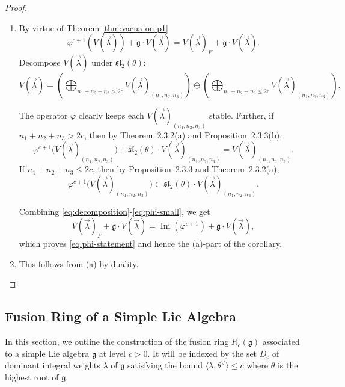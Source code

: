 \documentclass[12pt]{article}
\begin{document}
\begin{proof}
\leavevmode
\begin{enumerate}
    \item By virtue of Theorem \ref{thm:vacua-on-p1}
\begin{equation}\label{eq:phi-statement}
\varphi^{c+1}(V(\vec\lambda))+\mathfrak g\cdot V(\vec\lambda)
=
V(\vec\lambda)_F+\mathfrak g\cdot V(\vec\lambda).
\tag{1}
\end{equation}
Decompose $V(\vec\lambda)$ under $\mathfrak{sl}_2(\theta)$:
\begin{equation}\label{eq:decomposition}
V(\vec\lambda)
=
\left(\bigoplus_{n_1+n_2+n_3>2c}V(\vec\lambda)_{(n_1,n_2,n_3)}\right)
\oplus
\left(\bigoplus_{n_1+n_2+n_3\le2c}V(\vec\lambda)_{(n_1,n_2,n_3)}\right).
\tag{2}
\end{equation}

The operator $\varphi$ clearly keeps each $V(\vec\lambda)_{(n_1,n_2,n_3)}$ stable.  
Further, if $n_1+n_2+n_3>2c$, then by Theorem~2.3.2(a) and Proposition~2.3.3(b),
\begin{equation}\label{eq:phi-large}
\varphi^{c+1}\big(V(\vec\lambda)_{(n_1,n_2,n_3)}\big)
+\mathfrak{sl}_2(\theta)\cdot V(\vec\lambda)_{(n_1,n_2,n_3)}
=
V(\vec\lambda)_{(n_1,n_2,n_3)}.
\tag{3}
\end{equation}
If $n_1+n_2+n_3\le2c$, then by Proposition~2.3.3 and Theorem~2.3.2(a),
\begin{equation}\label{eq:phi-small}
\varphi^{c+1}\big(V(\vec\lambda)_{(n_1,n_2,n_3)}\big)
\subset
\mathfrak{sl}_2(\theta)\cdot V(\vec\lambda)_{(n_1,n_2,n_3)}.
\tag{4}
\end{equation}

Combining \eqref{eq:decomposition}-\eqref{eq:phi-small}, we get
\[
V(\vec\lambda)_F+\mathfrak g\cdot V(\vec\lambda)
=\operatorname{Im}(\varphi^{c+1})+\mathfrak g\cdot V(\vec\lambda),
\]
which proves \eqref{eq:phi-statement} and hence the (a)-part of the corollary.
    \item This follows from (a) by duality. \qedhere
\end{enumerate}
\end{proof}

\subsection{Fusion Ring of a Simple Lie Algebra}
In this section, we outline the construction of the fusion ring $R_c(\mathfrak{g})$ associated to a simple Lie algebra $\mathfrak{g}$ at level $c > 0$. It will be indexed by the set $D_c$ of dominant integral weights $\lambda$ of $\mathfrak{g}$ satisfying the bound $\langle \lambda, \theta^\vee \rangle \le c$ where $\theta$ is the highest root of $\mathfrak{g}$.
\end{document}
